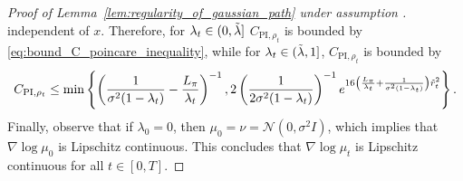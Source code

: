 \begin{proof}[Proof of Lemma~\ref{lem:regularity_of_gaussian_path} under assumption ]
\begin{equation}
\end{equation}
independent of $x$. Therefore, for $\lambda_t\in(0, \Tilde{\lambda}]$ $C_{\text{PI}, \rho_t}$ is bounded by \eqref{eq:bound_C_poincare_inequality}, while for $\lambda_t\in(\Tilde{\lambda}, 1]$, $C_{\text{PI}, \rho_t}$ is bounded by
\begin{equation*}
    C_{\text{PI}, \rho_t}\leq \min\left\{\left(\frac{1}{\sigma^2(1-\lambda_t)}-\frac{L_\pi}{\lambda_t}\right)^{-1},  2 \left(\frac{1}{2\sigma^2(1-\lambda_t)}\right)^{-1} e^{16\left(\frac{L_\pi}{\lambda_t} + \frac{1}{\sigma^2(1-\lambda_t)}\right)\Tilde{r}_t^2}\right\}.
\end{equation*}
Finally, observe that if $\lambda_0=0$, then $\mu_0 = \nu = \mathcal{N}(0, \sigma^2 I)$, which implies that $\nabla\log\mu_0$ is Lipschitz continuous. 
This concludes that $\nabla\log\mu_t$ is Lipschitz continuous for all $t\in[0,T]$.
\end{proof}